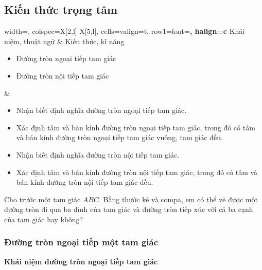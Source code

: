 \begin{lesson}
    \subsection{Kiến thức trọng tâm}

    \begin{center}
    \begin{tblr}{
        width=\linewidth,
        colspec={X[2,l] X[5,l]},
        cells={valign=t},
        row{1}={font=\bfseries, halign=c}
    }
        Khái niệm, thuật ngữ & Kiến thức, kĩ năng \\
        \begin{minipage}[t]{\linewidth}
        \begin{itemize}
            \item Đường tròn ngoại tiếp tam giác
            \item Đường tròn nội tiếp tam giác
        \end{itemize}
        \end{minipage}
        &
        \begin{minipage}[t]{\linewidth}
        \begin{itemize}
            \item Nhận biết định nghĩa đường tròn ngoại tiếp tam giác.
            \item Xác định tâm và bán kính đường tròn ngoại tiếp tam giác, trong đó có tâm và bán kính đường tròn ngoại tiếp tam giác vuông, tam giác đều.
            \item Nhận biết định nghĩa đường tròn nội tiếp tam giác.
            \item Xác định tâm và bán kính đường tròn nội tiếp tam giác, trong đó có tâm và bán kính đường tròn nội tiếp tam giác đều.
        \end{itemize}
        \end{minipage}
    \end{tblr}
    \end{center}

    Cho trước một tam giác $ABC$. Bằng thước kẻ và compa, em có thể vẽ được một đường tròn đi qua ba đỉnh của tam giác và đường tròn tiếp xúc với cả ba cạnh của tam giác hay không?

    \subsubsection{Đường tròn ngoại tiếp một tam giác}

    \textbf{Khái niệm đường tròn ngoại tiếp tam giác}


\end{lesson}
